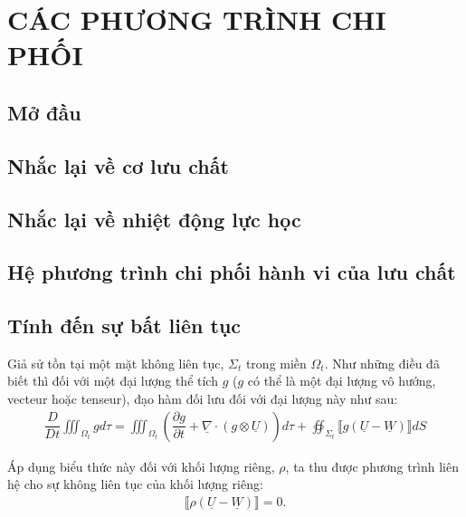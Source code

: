\documentclass[../DONG_CHAY_NEN_DUOC.tex]{subfiles}
\begin{document}
\chapter{CÁC PHƯƠNG TRÌNH CHI PHỐI}
	\section{Mở đầu}
		
	\section{Nhắc lại về cơ lưu chất}
		
	\section{Nhắc lại về nhiệt động lực học}
		
	\section{Hệ phương trình chi phối hành vi của lưu chất}
		
	\section{Tính đến sự bất liên tục}
Giả sử tồn tại một mặt không liên tục, $\Sigma_t$ trong miền $\Omega_t$. Như những điều đã biết thì đối với một đại lượng thể tích $g$ ($g$ có thể là một đại lượng vô hướng, vecteur hoặc tenseur), đạo hàm đối lưu đối với đại lượng này như sau:
\begin{align}
	\dfrac{D}{Dt}\iiint_{\Omega_t}gd\tau=\iiint_{\Omega_t}\left(\dfrac{\partial g}{\partial t}+\underline{\nabla}\cdot\left(g\otimes\underline{U}\right)\right)d\tau+\oiint_{\Sigma_t}\llbracket g\left(\underline{U}-\underline{W}\right)\rrbracket dS
\end{align}

Áp dụng biểu thức này đối với khối lượng riêng, $\rho$, ta thu được phương trình liên hệ cho sự không liên tục của khối lượng riêng:
\begin{align}
	\llbracket\rho\left(\underline U-\underline W\right)\rrbracket=0.
\end{align}
\end{document}
